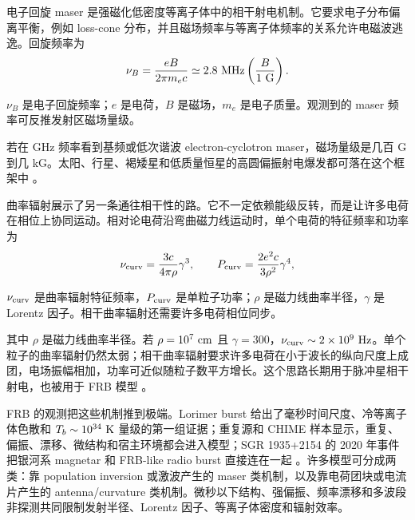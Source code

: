 电子回旋 maser 是强磁化低密度等离子体中的相干射电机制。它要求电子分布偏离平衡，例如 loss-cone 分布，并且磁场频率与等离子体频率的关系允许电磁波逃逸。回旋频率为
\begin{equation}
  \nu_B=\frac{eB}{2\pi m_ec}
       \simeq 2.8~{\rm MHz}\left(\frac{B}{1~{\rm G}}\right).
  \label{eq:ch09-cyclotron-frequency}
\end{equation}
\begin{formulaexplain}
\(\nu_B\) 是电子回旋频率；\(e\) 是电荷，\(B\) 是磁场，\(m_e\) 是电子质量。观测到的 maser 频率可反推发射区磁场量级。
\end{formulaexplain}
若在 GHz 频率看到基频或低次谐波 electron-cyclotron maser，磁场量级是几百 G 到几 kG。太阳、行星、褐矮星和低质量恒星的高圆偏振射电爆发都可落在这个框架中 \citep{1982ApJ...259..844M,2006A&ARv..13..229T,2008ApJ...684..644H,1985ARA&A..23..169D}。

曲率辐射展示了另一条通往相干性的路。它不一定依赖能级反转，而是让许多电荷在相位上协同运动。相对论电荷沿弯曲磁力线运动时，单个电荷的特征频率和功率为
\begin{equation}
  \nu_{\rm curv}=\frac{3c}{4\pi\rho}\gamma^3,
  \qquad
  P_{\rm curv}=\frac{2e^2c}{3\rho^2}\gamma^4 ,
  \label{eq:ch09-curvature}
\end{equation}
\begin{formulaexplain}
\(\nu_{\rm curv}\) 是曲率辐射特征频率，\(P_{\rm curv}\) 是单粒子功率；\(\rho\) 是磁力线曲率半径，\(\gamma\) 是 Lorentz 因子。相干曲率辐射还需要许多电荷相位同步。
\end{formulaexplain}
其中 \(\rho\) 是磁力线曲率半径。若 \(\rho=10^7~{\rm cm}\) 且 \(\gamma=300\)，\(\nu_{\rm curv}\sim2\times10^9~{\rm Hz}\)。单个粒子的曲率辐射仍然太弱；相干曲率辐射要求许多电荷在小于波长的纵向尺度上成团，电场振幅相加，功率可近似随粒子数平方增长。这个思路长期用于脉冲星相干射电，也被用于 FRB 模型 \citep{1977ApJ...212..800C,2018MNRAS.477.2470L}。

FRB 的观测把这些机制推到极端。Lorimer burst 给出了毫秒时间尺度、冷等离子体色散和 \(T_b\sim10^{34}~{\rm K}\) 量级的第一组证据；重复源和 CHIME 样本显示，重复、偏振、漂移、微结构和宿主环境都会进入模型；SGR 1935+2154 的 2020 年事件把银河系 magnetar 和 FRB-like radio burst 直接连在一起 \citep{2007Sci...318..777L,2019A&ARv..27....4P,2022A&ARv..30....2P,2020Natur.587...54C,2020Natur.587...59B}。许多模型可分成两类：靠 population inversion 或激波产生的 maser 类机制，以及靠电荷团块或电流片产生的 antenna/curvature 类机制。微秒以下结构、强偏振、频率漂移和多波段非探测共同限制发射半径、Lorentz 因子、等离子体密度和辐射效率。

